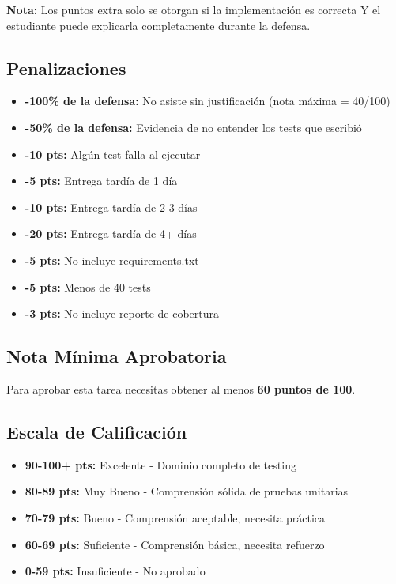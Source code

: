 \documentclass[12pt,a4paper]{article}
\begin{document}
\textbf{Nota:} Los puntos extra solo se otorgan si la implementación es correcta Y el estudiante puede explicarla completamente durante la defensa.

\subsection{Penalizaciones}

\begin{itemize}[leftmargin=*]
    \item \textbf{-100\% de la defensa:} No asiste sin justificación (nota máxima = 40/100)
    \item \textbf{-50\% de la defensa:} Evidencia de no entender los tests que escribió
    \item \textbf{-10 pts:} Algún test falla al ejecutar
    \item \textbf{-5 pts:} Entrega tardía de 1 día
    \item \textbf{-10 pts:} Entrega tardía de 2-3 días
    \item \textbf{-20 pts:} Entrega tardía de 4+ días
    \item \textbf{-5 pts:} No incluye requirements.txt
    \item \textbf{-5 pts:} Menos de 40 tests
    \item \textbf{-3 pts:} No incluye reporte de cobertura
\end{itemize}

\subsection{Nota Mínima Aprobatoria}

Para aprobar esta tarea necesitas obtener al menos \textbf{60 puntos de 100}.

\subsection{Escala de Calificación}

\begin{itemize}
    \item \textbf{90-100+ pts:} Excelente - Dominio completo de testing
    \item \textbf{80-89 pts:} Muy Bueno - Comprensión sólida de pruebas unitarias
    \item \textbf{70-79 pts:} Bueno - Comprensión aceptable, necesita práctica
    \item \textbf{60-69 pts:} Suficiente - Comprensión básica, necesita refuerzo
    \item \textbf{0-59 pts:} Insuficiente - No aprobado
\end{itemize}
\end{document}
